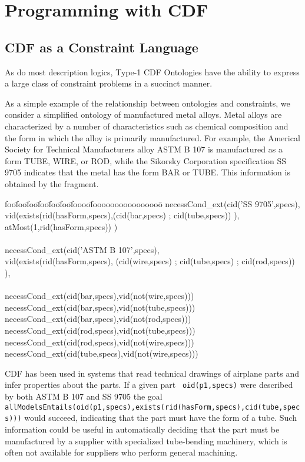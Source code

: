 
\chapter{Programming with CDF}

\section{CDF as a Constraint Language}

As do most description logics, Type-1 CDF Ontologies have the ability
to express a large class of constraint problems in a succinct manner.

\begin{example} \rm
As a simple example of the relationship between ontologies and
constraints, we consider a simplified ontology of manufactured metal
alloys.  Metal alloys are characterized by a number of characteristics
such as chemical composition and the form in which the alloy is
primarily manufactured.  For example, the Americal Society for
Technical Manufacturers alloy ASTM B 107 is manufactured as a form
TUBE, WIRE, or ROD, while the Sikorsky Corporation specification SS
9705 indicates that the metal has the form BAR or TUBE.  This
information is obtained by the fragment.
{\tt  {\small 
\begin{tabbing} foo\=foo\=foo\=foo\=foo\=foo\=foooo\=foooooooooooooooo\=\kill
\> necessCond\_ext(cid('SS 9705',specs), \\
\> \> \>              vid(exists(rid(hasForm,specs),(cid(bar,specs) ; cid(tube,specs)) ), \\
\> \> \> 	              atMost(1,rid(hasForm,specs)) ) \\
\\
\> necessCond\_ext(cid('ASTM B 107',specs), \\
\>\> \>              vid(exists(rid(hasForm,specs),
	(cid(wire,specs) ; cid(tube,specs) ; cid(rod,specs)) ), \\
\\
\> necessCond\_ext(cid(bar,specs),vid(not(wire,specs))) \\
\> necessCond\_ext(cid(bar,specs),vid(not(tube,specs))) \\
\> necessCond\_ext(cid(bar,specs),vid(not(rod,specs))) \\
\> necessCond\_ext(cid(rod,specs),vid(not(tube,specs))) \\
\> necessCond\_ext(cid(rod,specs),vid(not(wire,specs))) \\
\> necessCond\_ext(cid(tube,specs),vid(not(wire,specs))) 
\end{tabbing} }}
CDF has been used in systems that read technical drawings of airplane
parts and infer properties about the parts.  If a given part {\tt
oid(p1,specs)} were described by both ASTM B 107 and SS 9705 the goal
{\tt
allModelsEntails(oid(p1,specs),exists(rid(hasForm,specs),cid(tube,specs)))}
would succeed, indicating that the part must have the form of a tube.
Such information could be useful in automatically deciding that the
part must be manufactured by a supplier with specialized tube-bending
machinery, which is often not available for suppliers who perform
general machining.
\end{example}

